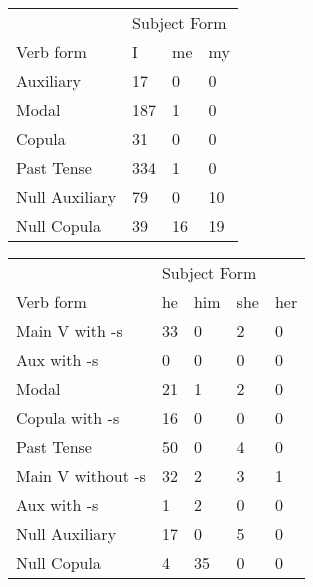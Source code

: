 \begin{table}[]
\begin{minipage}{0.5\textwidth}
    \centering
    \begin{tabular}{@{}llll@{}}
        \toprule
            &\multicolumn{3}{l}{Subject Form}\\
            \cline{2-4}
        Verb form & I & me & my \\
        \midrule
        Auxiliary & 17 & 0 & 0 \\
        Modal & 187 & 1 & 0 \\
        Copula & 31 & 0 & 0 \\
        Past Tense & 334 & 1 & 0 \\
        \hline
        Null Auxiliary & 79 & 0 & 10 \\
        Null Copula & 39 & 16 & 19 \\
        \bottomrule
    \end{tabular}
\end{minipage}
\begin{minipage}{0.5\textwidth}
    \centering
    \begin{tabular}{@{}lllll@{}}
        \toprule
            &\multicolumn{4}{l}{Subject Form}\\
            \cline{2-5}
        Verb form & he & him & she & her \\
        \midrule
        Main V with -s & 33 & 0 & 2 & 0 \\
        Aux with -s & 0 & 0 & 0 & 0 \\
        Modal & 21 & 1 & 2 & 0 \\
        Copula with -s & 16 & 0 & 0 & 0 \\
        Past Tense & 50 & 0 & 4 & 0 \\
        \hline
        Main V without -s & 32 & 2 & 3 & 1 \\
        Aux with -s & 1 & 2 & 0 & 0 \\
        Null Auxiliary & 17 & 0 & 5 & 0 \\
        Null Copula & 4 & 35 & 0 & 0 \\
        \bottomrule
    \end{tabular}
    \end{minipage}
\end{table}

